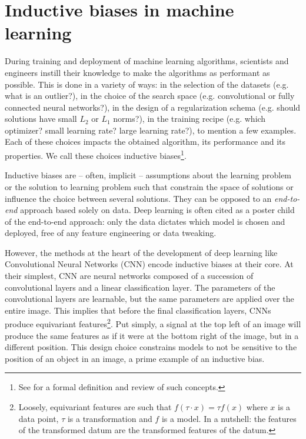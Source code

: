 
\section{Inductive biases in machine learning}

During training and deployment of machine learning algorithms, scientists and engineers instill their knowledge to make the algorithms as performant as possible. This is done in a variety of ways: in the selection of the datasets (e.g. what is an outlier?), in the choice of the search space (e.g. convolutional or fully connected neural networks?), in the design of a regularization schema (e.g. should solutions have small $L_2$ or $L_1$ norms?), in the training recipe (e.g. which optimizer? small learning rate? large learning rate?), to mention a few examples. Each of these choices impacts the obtained algorithm, its performance and its properties. We call these choices inductive biases\footnote{See \cite{mitchell-inductive,1806.01261} for a formal definition and review of such concepts.}.

Inductive biases are -- often, implicit -- assumptions about the learning problem or the solution to learning problem such that constrain the space of solutions or influence the choice between several solutions. They can be opposed to an \emph{end-to-end} approach based solely on data. Deep learning is often cited as a poster child of the end-to-end approach: only the data dictates which model is chosen and deployed, free of any feature engineering or data tweaking.

However, the methods at the heart of the development of deep learning like Convolutional Neural Networks (CNN) encode inductive biases at their core. At their simplest, CNN are neural networks composed of a succession of convolutional layers and a linear classification layer. The parameters of the convolutional layers are learnable, but the same parameters are applied over the entire image. This implies that before the final classification layers, CNNs produce equivariant features\footnote{Loosely, equivariant features are such that $f(\tau \cdot x)=\tau f(x)$ where $x$ is a data point, $\tau$ is a transformation and $f$ is a model. In a nutshell: the features of the transformed datum are the transformed features of the datum.}. Put simply, a signal at the top left of an image will produce the same features as if it were at the bottom right of the image, but in a different position. This design choice constrains models to not be sensitive to the position of an object in an image, a prime example of an inductive bias.

